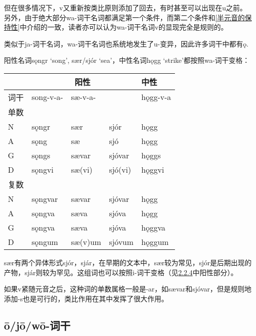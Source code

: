但在很多情况下，v又重新按类比原则添加了回去，有时甚至可以出现在u之前。另外，由于绝大部分wa-词干名词都满足第一个条件，而第二个条件和\ref{半元音的保持性}中介绍的一致，读者亦可以认为wa-词干名词v的显现完全是规则的。

类似于ja-词干名词，wa-词干名词也系统地发生了u-变异，因此许多词干中都有ǫ.

阳性名词sǫngr `song', sær/sjór `sea'，中性名词hǫgg
`strike'都按照wa-词干变格：

\begin{longtable}{lllll}
  \toprule
       & \multicolumn{3}{c}{阳性} & 中性                         \\
  \midrule
  \endhead
  \bottomrule
  \endfoot
  词干 & song-v-a-                & sæ-v-a- &         & hǫgg-v-a \\
  单数 &                          &         &         &          \\
  N    & sǫngr                    & sær     & sjór    & hǫgg     \\
  A    & sǫng                     & sæ      & sjó     & hǫgg     \\
  G    & sǫngs                    & sævar   & sjóvar  & hǫggs    \\
  D    & sǫngvi                   & sæ(vi)  & sjó(vi) & hǫggvi   \\
  复数 &                          &         &         &          \\
  N    & sǫngvar                  & sævar   & sjóvar  & hǫgg     \\
  A    & sǫngva                   & sæva    & sjóva   & hǫgg     \\
  G    & sǫngva                   & sæva    & sjóva   & hǫggva   \\
  D    & sǫngum                   & sæ(v)um & sjóvum  & hǫggum   \\
\end{longtable}

sær有两个异体形式sjór，sjár，在早期的文本中，sær较为常见，sjór是后期出现的产物，sjár则较为罕见。这组词也可以按照i-词干变格（见\hyperref[_Ref115770706]{2.2.4}中阳性部分）。

如果v紧随元音之后，这种词的单数属格一般是-ar，如sævar和sjóvar，但是规则地添加-s也是可行的，类比作用在其中发挥了很大作用。

\subsection{ō/jō/wō-词干}\label{ō/jō/wō-词干}

